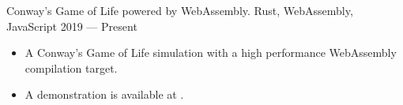 \showoff
{}
{Conway's Game of Life powered by WebAssembly.}
{Rust, WebAssembly, JavaScript}
{2019 --- Present}

\begin{itemize}
    \item A Conway's Game of Life simulation with a high performance WebAssembly compilation target.
    \item A demonstration is available at .
\end{itemize}
